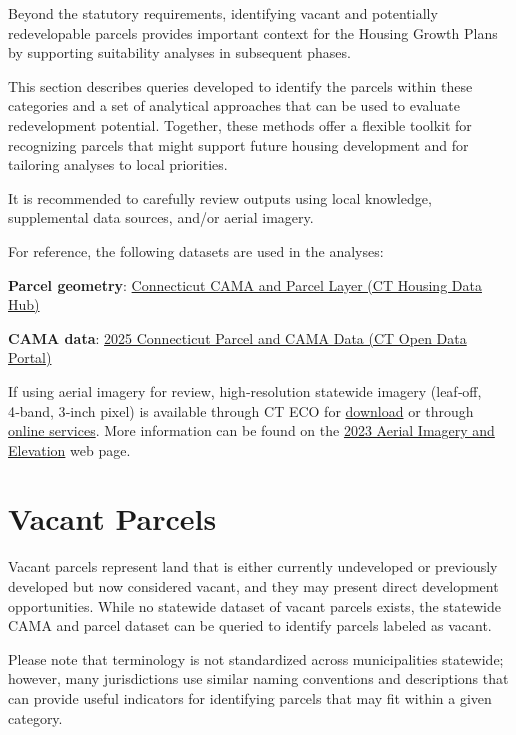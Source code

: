\documentclass[
  letterpaper,
  DIV=11,
  numbers=noendperiod]{scrreprt}
\begin{document}
Beyond the statutory requirements, identifying vacant and potentially
redevelopable parcels provides important context for the Housing Growth
Plans by supporting suitability analyses in subsequent phases.

This section describes queries developed to identify the parcels within
these categories and a set of analytical approaches that can be used to
evaluate redevelopment potential. Together, these methods offer a
flexible toolkit for recognizing parcels that might support future
housing development and for tailoring analyses to local priorities.

It is recommended to carefully review outputs using local knowledge,
supplemental data sources, and/or aerial imagery.

For reference, the following datasets are used in the analyses:

\textbf{Parcel geometry}:
\href{https://housingmaps.ct.gov/datasets/ctmaps::connecticut-cama-and-parcel-layer/about}{Connecticut
CAMA and Parcel Layer (CT Housing Data Hub)}

\textbf{CAMA data}:
\href{https://data.ct.gov/Local-Government/2025-Connecticut-Parcel-and-CAMA-Data/rny9-6ak2/about_data}{2025
Connecticut Parcel and CAMA Data (CT Open Data Portal)}

If using aerial imagery for review, high‑resolution statewide imagery
(leaf‑off, 4‑band, 3‑inch pixel) is available through CT ECO for
\href{https://maps.cteco.uconn.edu/download/}{download} or through
\href{https://maps.cteco.uconn.edu/map-services/}{online services}. More
information can be found on the
\href{https://maps.cteco.uconn.edu/data/flight2023/}{2023 Aerial Imagery
and Elevation} web page.

\section{Vacant Parcels}\label{vacant-parcels}

Vacant parcels represent land that is either currently undeveloped or
previously developed but now considered vacant, and they may present
direct development opportunities. While no statewide dataset of vacant
parcels exists, the statewide CAMA and parcel dataset can be queried to
identify parcels labeled as vacant.

\begin{tcolorbox}[enhanced jigsaw, arc=.35mm, bottomrule=.15mm, breakable, colback=white, colframe=quarto-callout-warning-color-frame, left=2mm, leftrule=.75mm, opacityback=0, rightrule=.15mm, toprule=.15mm]

Please note that terminology is not standardized across municipalities
statewide; however, many jurisdictions use similar naming conventions
and descriptions that can provide useful indicators for identifying
parcels that may fit within a given category.

\end{tcolorbox}
\end{document}
